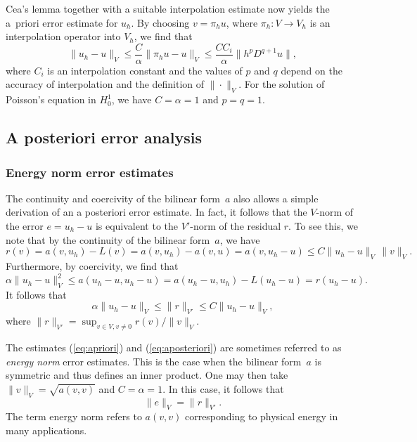Cea's lemma together with a suitable interpolation estimate now yields
the a~priori error estimate for $u_h$. By choosing $v = \pi_h u$,
where $\pi_h : V \rightarrow V_h$ is an interpolation operator into
$V_h$, we find that
\begin{equation} \label{eq:apriori}
  \|u_h - u\|_V
  \leq \frac{C}{\alpha} \|\pi_h u - u\|_V
  \leq \frac{C C_i}{\alpha} \|h^p D^{q + 1} u\|,
\end{equation}
where $C_i$ is an interpolation constant and the values of $p$ and $q$
depend on the accuracy of interpolation and the definition of
$\|\cdot\|_V$. For the solution of Poisson's equation in $H^1_0$, we
have $C = \alpha = 1$ and $p = q = 1$.

\subsection{A posteriori error analysis}

\subsubsection{Energy norm error estimates}

The continuity and coercivity of the bilinear form~$a$ also allows a
simple derivation of an a posteriori error estimate.  In fact, it
follows that the $V$-norm of the error $e = u_h - u$ is equivalent to
the $V'$-norm of the residual $r$. To see this, we note that by the
continuity of the bilinear form~$a$, we have
\begin{displaymath}
  r(v)
  = a(v, u_h) - L(v) = a(v, u_h) - a(v, u) = a(v, u_h - u)
  \leq C \|u_h - u\|_V \, \|v\|_V.
\end{displaymath}
Furthermore, by coercivity, we find that
\begin{displaymath}
  \alpha \|u_h - u\|^2_V
  \leq a(u_h - u, u_h - u)
  = a(u_h - u, u_h) - L(u_h - u) = r(u_h - u).
\end{displaymath}
It follows that
\begin{equation} \label{eq:aposteriori}
  \alpha \|u_h - u\|_V \leq \|r\|_{V'} \leq C \|u_h - u\|_V,
\end{equation}
where $\|r\|_{V'} = \sup_{v \in V, v \neq 0} r(v)/ \|v\|_V$.

The estimates (\ref{eq:apriori}) and (\ref{eq:aposteriori}) are
sometimes referred to as \emph{energy norm} error estimates. This is
the case when the bilinear form~$a$ is symmetric and thus defines an
inner product. One may then take $\|v\|_V = \sqrt{a(v, v)}$ and $C =
\alpha = 1$. In this case, it follows that
\begin{equation} \label{eq:aposteriori,energynorm}
  \|e\|_V = \|r\|_{V'}.
\end{equation}
The term energy norm refers to $a(v, v)$ corresponding to physical
energy in many applications.

